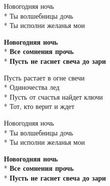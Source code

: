 \medskip

\begin{minipage}{\linewidth}
\hspace*{1.5em}Новогодняя ночь\\*
\hspace*{1.5em}Ты волшебницы дочь\\*
\hspace*{1.5em}Ты исполни желанья мои\\
\end{minipage}\par\medskip\nobreak

\medskip

\begin{minipage}{\linewidth}
\hspace*{1.5em}\textbf{Новогодняя ночь}\\*
\hspace*{1.5em}\textbf{Все сомнения прочь}\\*
\hspace*{1.5em}\textbf{Пусть не гаснет свеча до зари}\\
\end{minipage}\par\medskip\nobreak

\medskip

\begin{minipage}{\linewidth}
Пусть растает в огне свечи\\*
Одиночества лед\\*
Пусть от счастья найдет ключи\\*
Тот, кто верит и ждет\\
\end{minipage}\par\medskip\nobreak

\medskip

\begin{minipage}{\linewidth}
\hspace*{1.5em}Новогодняя ночь\\*
\hspace*{1.5em}Ты волшебницы дочь\\*
\hspace*{1.5em}Ты исполни желанья мои\\
\end{minipage}\par\medskip\nobreak

\medskip

\begin{minipage}{\linewidth}
\hspace*{1.5em}\textbf{Новогодняя ночь}\\*
\hspace*{1.5em}\textbf{Все сомнения прочь}\\*
\hspace*{1.5em}\textbf{Пусть не гаснет свеча до зари}\\
\end{minipage}

